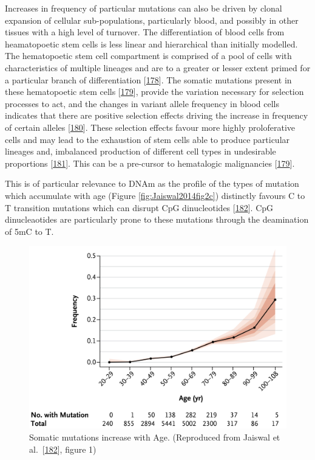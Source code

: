 \documentclass[
]{book}
\begin{document}
Increases in frequency of particular mutations can also be driven by clonal expansion of cellular sub-populations, particularly blood, and possibly in other tissues with a high level of turnover.
The differentiation of blood cells from heamatopoetic stem cells is less linear and hierarchical than initially modelled.
The hematopoetic stem cell compartment is comprised of a pool of cells with characteristics of multiple lineages and are to a greater or lesser extent primed for a particular branch of differentiation {[}\protect\hyperlink{ref-Velten2017}{178}{]}.
The somatic mutations present in these hematopoetic stem cells {[}\protect\hyperlink{ref-Jaiswal2014}{179}{]}, provide the variation necessary for selection processes to act, and the changes in variant allele frequency in blood cells indicates that there are positive selection effects driving the increase in frequency of certain alleles {[}\protect\hyperlink{ref-Watson2020}{180}{]}.
These selection effects favour more highly proloferative cells and may lead to the exhaustion of stem cells able to produce particular lineages and, imbalanced production of different cell types in undesirable proportions {[}\protect\hyperlink{ref-Kirschner2017}{181}{]}.
This can be a pre-cursor to hematalogic malignancies {[}\protect\hyperlink{ref-Jaiswal2014}{179}{]}.

This is of particular relevance to DNAm as the profile of the types of mutation which accumulate with age (Figure \ref{fig:Jaiswal2014fig2c}) distinctly favours C to T transition mutations which can disrupt CpG dinucleotides {[}\protect\hyperlink{ref-Jaiswal2014c}{182}{]}.
CpG dinucleaotides are particularly prone to these mutations through the deamination of 5mC to T.

\begin{figure}

{\centering \includegraphics[width=0.6\linewidth]{figs/Jaiswal2014fig1_somaticMutationAge} 

}

\caption{Somatic mutations increase with Age. (Reproduced from Jaiswal et al.~{[}\protect\hyperlink{ref-Jaiswal2014c}{182}{]}, figure 1)}\label{fig:Jaiswal2014fig1}
\end{figure}
\end{document}
